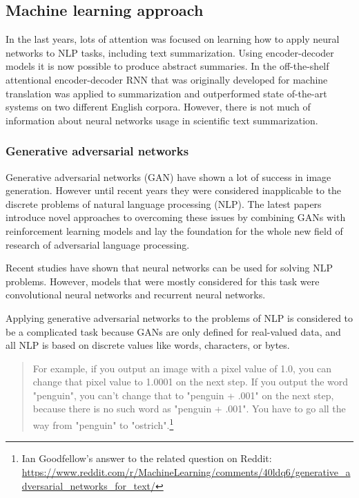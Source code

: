 \documentclass[sigplan]{acmart}
\begin{document}
\subsection{Machine learning approach}

In the last years, lots of attention was focused on learning how to apply neural networks to NLP tasks, including text summarization. Using encoder-decoder models it is now possible to produce abstract summaries. In \cite{nallapati-16} the off-the-shelf attentional encoder-decoder RNN that was originally developed for machine translation was applied to summarization and outperformed state of-the-art systems on two different English corpora. However, there is not much of information about neural networks usage in scientific text summarization.

\subsubsection{Generative adversarial networks}
Generative adversarial networks (GAN) have shown a lot of success in image generation. However until recent years they were considered inapplicable to the discrete problems of natural language processing (NLP). The latest papers introduce novel approaches to overcoming these issues by combining GANs with reinforcement learning models and lay the foundation for the whole new field of research of adversarial language processing.

Recent studies have shown that neural networks can be used for solving NLP problems. However, models that were mostly considered for this task were convolutional neural networks and recurrent neural networks.

Applying generative adversarial networks to the problems of NLP is considered to be a complicated task because GANs are only defined for real-valued data, and all NLP is based on discrete values like words, characters, or bytes.

\begin{quote}
For example, if you output an image with a pixel value of 1.0, you can change that pixel value to 1.0001 on the next step. If you output the word "penguin", you can't change that to "penguin + .001" on the next step, because there is no such word as "penguin + .001". You have to go all the way from "penguin" to "ostrich".\footnote{Ian Goodfellow's answer to the related question on Reddit: \url{https://www.reddit.com/r/MachineLearning/comments/40ldq6/generative_adversarial_networks_for_text/}}
\end{quote}
\end{document}
